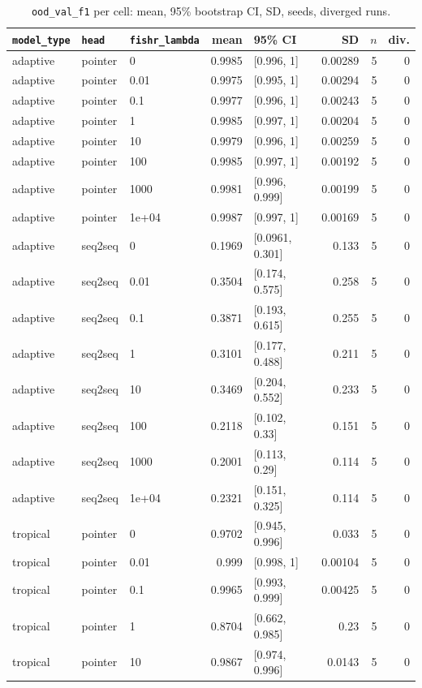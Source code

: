 \documentclass[10pt]{article}
\begin{document}
{\small
\begin{longtable}{lllrlrrr}
\caption{\texttt{ood\_val\_f1} per cell: mean, 95\% bootstrap CI, SD, seeds, diverged runs.}\label{tab:summary-ood_val_f1}\\
\toprule
\texttt{model\_type} & \texttt{head} & \texttt{fishr\_lambda} & mean & 95\% CI & SD & $n$ & div.\\
\midrule
\endhead
adaptive & pointer & 0 & 0.9985 & [0.996, 1] & 0.00289 & 5 & 0\\
adaptive & pointer & 0.01 & 0.9975 & [0.995, 1] & 0.00294 & 5 & 0\\
adaptive & pointer & 0.1 & 0.9977 & [0.996, 1] & 0.00243 & 5 & 0\\
adaptive & pointer & 1 & 0.9985 & [0.997, 1] & 0.00204 & 5 & 0\\
adaptive & pointer & 10 & 0.9979 & [0.996, 1] & 0.00259 & 5 & 0\\
adaptive & pointer & 100 & 0.9985 & [0.997, 1] & 0.00192 & 5 & 0\\
adaptive & pointer & 1000 & 0.9981 & [0.996, 0.999] & 0.00199 & 5 & 0\\
adaptive & pointer & 1e+04 & 0.9987 & [0.997, 1] & 0.00169 & 5 & 0\\
adaptive & seq2seq & 0 & 0.1969 & [0.0961, 0.301] & 0.133 & 5 & 0\\
adaptive & seq2seq & 0.01 & 0.3504 & [0.174, 0.575] & 0.258 & 5 & 0\\
adaptive & seq2seq & 0.1 & 0.3871 & [0.193, 0.615] & 0.255 & 5 & 0\\
adaptive & seq2seq & 1 & 0.3101 & [0.177, 0.488] & 0.211 & 5 & 0\\
adaptive & seq2seq & 10 & 0.3469 & [0.204, 0.552] & 0.233 & 5 & 0\\
adaptive & seq2seq & 100 & 0.2118 & [0.102, 0.33] & 0.151 & 5 & 0\\
adaptive & seq2seq & 1000 & 0.2001 & [0.113, 0.29] & 0.114 & 5 & 0\\
adaptive & seq2seq & 1e+04 & 0.2321 & [0.151, 0.325] & 0.114 & 5 & 0\\
tropical & pointer & 0 & 0.9702 & [0.945, 0.996] & 0.033 & 5 & 0\\
tropical & pointer & 0.01 & 0.999 & [0.998, 1] & 0.00104 & 5 & 0\\
tropical & pointer & 0.1 & 0.9965 & [0.993, 0.999] & 0.00425 & 5 & 0\\
tropical & pointer & 1 & 0.8704 & [0.662, 0.985] & 0.23 & 5 & 0\\
tropical & pointer & 10 & 0.9867 & [0.974, 0.996] & 0.0143 & 5 & 0\\

\end{longtable}}
\end{document}
